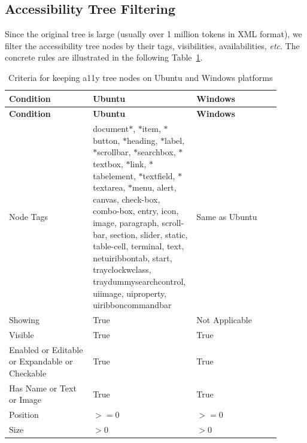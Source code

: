 \subsection{Accessibility Tree Filtering}
\label{app:a11y_tree_handling}
Since the original tree is large (usually over 1 million tokens in XML format), we 
filter the accessibility tree nodes by their tags, visibilities, availabilities,
\textit{etc}. The concrete rules are illustrated in 
the following Table~\ref{table:a11y_tree_handling}.

\begin{longtable}{p{0.3\linewidth}p{0.3\linewidth}p{0.3\linewidth}}
\caption{Criteria for keeping a11y tree nodes on Ubuntu and Windows platforms}
\label{table:a11y_tree_handling}\\
\toprule
\textbf{Condition} & \textbf{Ubuntu} & \textbf{Windows} \\
\midrule
\endfirsthead
\toprule
\textbf{Condition} & \textbf{Ubuntu} & \textbf{Windows} \\
\midrule
\endhead
\bottomrule
\endfoot
Node Tags & document$*$, $*$item, $*$button, $*$heading, $*$label, $*$scrollbar, $*$searchbox, $*$textbox, $*$link, $*$tabelement, $*$textfield, $*$textarea, $*$menu,
alert, canvas, check-box, combo-box, entry, icon, image, paragraph, scroll-bar, section, slider, static, table-cell, terminal, text, netuiribbontab, start, trayclockwclass, traydummysearchcontrol, uiimage, uiproperty, uiribboncommandbar & Same as Ubuntu \\
\midrule
Showing & True & Not Applicable \\
\midrule
Visible & True & True \\
\midrule
Enabled or Editable or Expandable or Checkable & True & True \\
\midrule
Has Name or Text or Image & True & True \\
\midrule
Position &  $>= 0$ &    $>= 0$ \\
\midrule
Size &  $> 0$ &    $> 0$ \\
\end{longtable}


